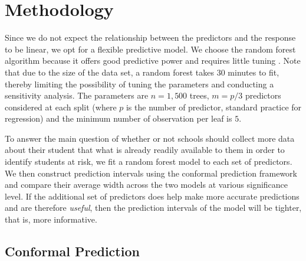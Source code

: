 \documentclass[10pt]{jmlr}%
\begin{document}
\section{Methodology}

Since we do not expect the relationship between the predictors and the response to be linear, we opt for a flexible predictive model. We choose the random forest algorithm because it offers good predictive power and requires little tuning . Note that due to the size of the data set, a random forest takes 30 minutes to fit, thereby limiting the possibility of tuning the parameters and conducting a sensitivity analysis. The parameters are $n=1,500$ trees, $m=p/3$ predictors considered at each split (where $p$ is the number of predictor, standard practice for regression) and the minimum number of observation per leaf is $5$.

To answer the main question of whether or not schools should collect more data about their student that what is already readily available to them in order to identify students at risk, we fit a random forest model to each set of predictors. We then construct prediction intervals using the conformal prediction framework and compare their average width across the two models at various significance level. If the additional set of predictors does help make more accurate predictions and are therefore \textit{useful}, then the prediction intervals of the model will be tighter, that is, more informative.

\subsection{Conformal Prediction}
\end{document}

